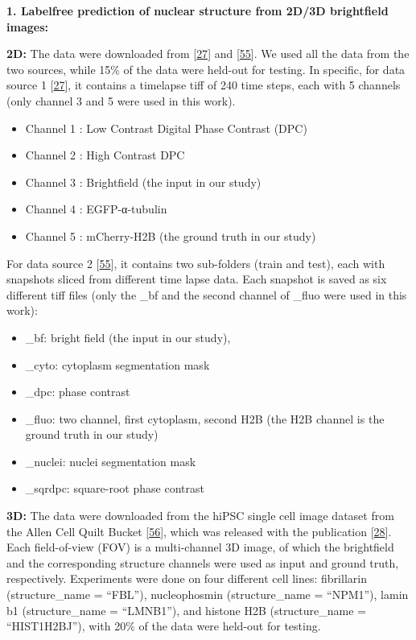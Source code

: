 \textbf{1. Labelfree prediction of nuclear structure from 2D/3D brightfield images:}

\textbf{2D:} The data were downloaded from {[}\protect\hyperlink{ref-xv2VIyRP}{27}{]} and {[}\protect\hyperlink{ref-8ywSgqrJ}{55}{]}. We used all the data from the two sources, while 15\% of the data were held-out for testing. In specific, for data source 1 {[}\protect\hyperlink{ref-xv2VIyRP}{27}{]}, it contains a timelapse tiff of 240 time steps, each with 5 channels (only channel 3 and 5 were used in this work).

\begin{itemize}
\tightlist
\item
  Channel 1 : Low Contrast Digital Phase Contrast (DPC)
\item
  Channel 2 : High Contrast DPC
\item
  Channel 3 : Brightfield (the input in our study)
\item
  Channel 4 : EGFP-α-tubulin
\item
  Channel 5 : mCherry-H2B (the ground truth in our study)
\end{itemize}

For data source 2 {[}\protect\hyperlink{ref-8ywSgqrJ}{55}{]}, it contains two sub-folders (train and test), each with snapshots sliced from different time lapse data. Each snapshot is saved as six different tiff files (only the \_bf and the second channel of \_fluo were used in this work):

\begin{itemize}
\tightlist
\item
  \_bf: bright field (the input in our study),
\item
  \_cyto: cytoplasm segmentation mask
\item
  \_dpc: phase contrast
\item
  \_fluo: two channel, first cytoplasm, second H2B (the H2B channel is the ground truth in our study)
\item
  \_nuclei: nuclei segmentation mask
\item
  \_sqrdpc: square-root phase contrast
\end{itemize}

\textbf{3D:} The data were downloaded from the hiPSC single cell image dataset from the Allen Cell Quilt Bucket {[}\protect\hyperlink{ref-vm45dW9e}{56}{]}, which was released with the publication {[}\protect\hyperlink{ref-5sGcmDuy}{28}{]}. Each field-of-view (FOV) is a multi-channel 3D image, of which the brightfield and the corresponding structure channels were used as input and ground truth, respectively. Experiments were done on four different cell lines: fibrillarin (structure\_name = ``FBL''), nucleophosmin (structure\_name = ``NPM1''), lamin b1 (structure\_name = ``LMNB1''), and histone H2B (structure\_name = ``HIST1H2BJ''), with 20\% of the data were held-out for testing.

